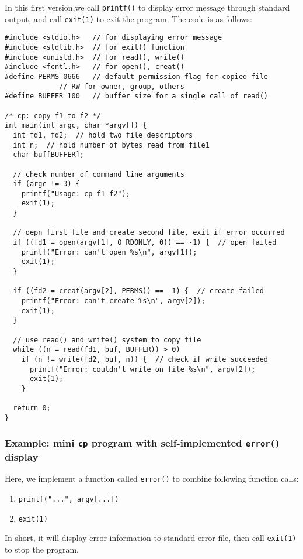\documentclass[12pt]{article}
\begin{document}
In this first version,we call \texttt{printf()} to display error message through standard output, and call \texttt{exit(1)} to exit the program. The code is as follows:
\begin{verbatim}
#include <stdio.h>   // for displaying error message
#include <stdlib.h>  // for exit() function
#include <unistd.h>  // for read(), write()
#include <fcntl.h>   // for open(), creat()
#define PERMS 0666   // default permission flag for copied file
		     // RW for owner, group, others
#define BUFFER 100   // buffer size for a single call of read()

/* cp: copy f1 to f2 */                    
int main(int argc, char *argv[]) {
  int fd1, fd2;  // hold two file descriptors
  int n;  // hold number of bytes read from file1
  char buf[BUFFER];

  // check number of command line arguments
  if (argc != 3) {
    printf("Usage: cp f1 f2");
    exit(1);
  }

  // oepn first file and create second file, exit if error occurred
  if ((fd1 = open(argv[1], O_RDONLY, 0)) == -1) {  // open failed
    printf("Error: can't open %s\n", argv[1]);
    exit(1);
  }

  if ((fd2 = creat(argv[2], PERMS)) == -1) {  // create failed
    printf("Error: can't create %s\n", argv[2]);
    exit(1);
  }

  // use read() and write() system to copy file
  while ((n = read(fd1, buf, BUFFER)) > 0)
    if (n != write(fd2, buf, n)) {  // check if write succeeded
      printf("Error: couldn't write on file %s\n", argv[2]);
      exit(1);
    }

  return 0;
}                    
\end{verbatim}
\subsubsection{Example: mini \texttt{cp} program with self-implemented \texttt{error()} display}
\label{sec:org4437038}
Here, we implement a function called \texttt{error()} to combine following function calls:
\begin{enumerate}
\item \texttt{printf("...", argv[...])}
\item \texttt{exit(1)}
\end{enumerate}

In short, it will display error information to standard error file, then call \texttt{exit(1)} to stop the program.
\end{document}
